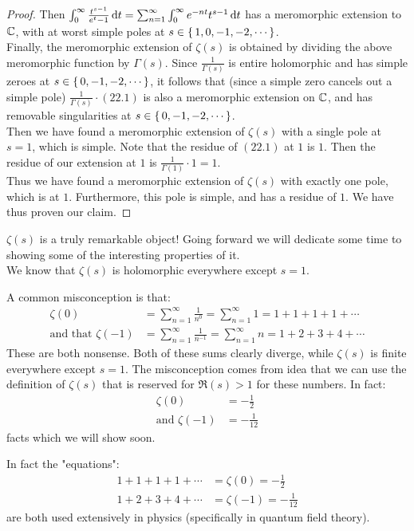 \begin{proof}
Then $\int_0^\infty \frac{t^{s-1}}{e^t - 1}  \dif t = \sum_{n=1}^\infty \int_0^\infty e^{-nt} t^{s-1} \dif t$ has a meromorphic extension to $\mathbb{C}$, with at worst simple poles at $s \in \set{1,0,-1,-2, \cdots}$.\\

Finally, the meromorphic extension of $\zeta(s)$ is obtained by dividing the above meromorphic function by $\Gamma(s)$. Since $\frac{1}{\Gamma(s)}$ is entire holomorphic and has simple zeroes at $s \in \set{0,-1,-2, \cdots}$, it follows that (since a simple zero cancels out a simple pole) $\frac{1}{\Gamma(s)} \cdot (22.1) $ is also a meromorphic extension on $\mathbb{C}$, and has removable singularities at $s \in \set{0,-1,-2, \cdots}$.\\

Then we have found a meromorphic extension of $\zeta(s)$ with a single pole at $s = 1$, which is simple. Note that the residue of $(22.1)$ at $1$ is $1$. Then the residue of our extension at $1$ is $\frac{1}{\Gamma(1)} \cdot 1 = 1$.\\

Thus we have found a meromorphic extension of $\zeta(s)$ with exactly one pole, which is at $1$. Furthermore, this pole is simple, and has a residue of $1$. We have thus proven our claim.

\end{proof}

$\zeta(s)$ is a truly remarkable object! Going forward we will dedicate some time to showing some of the interesting properties of it.\\

We know that $\zeta(s)$ is holomorphic everywhere except $s=1$.

\begin{remark}
A common misconception is that:
\begin{align*}
    \zeta(0) &= \sum_{n=1}^\infty \frac{1}{n^0} = \sum_{n=1}^\infty 1 = 1+1+1+1+\cdots\\
    \text{and that }\zeta(-1) &= \sum_{n=1}^\infty \frac{1}{n^{-1}} = \sum_{n=1}^\infty n = 1+2+3+4+\cdots
\end{align*}
These are both nonsense. Both of these sums clearly diverge, while $\zeta(s)$ is finite everywhere except $s=1$. The misconception comes from idea that we can use the definition of $\zeta(s)$ that is reserved for $\Re(s) > 1$ for these numbers. In fact:
\begin{align*}
    \zeta(0) &= -\frac{1}{2}\\
    \text{and } \zeta(-1) &= - \frac{1}{12}
\end{align*}
facts which we will show soon.

\end{remark}
\begin{note}
In fact the "equations":
\begin{align*}
    1+1+1+1+\cdots &= \zeta(0) = -\frac{1}{2}\\
    1+2+3+4+\cdots &= \zeta(-1) = - \frac{1}{12}
\end{align*}
are both used extensively in physics (specifically in quantum field theory).
\end{note}

